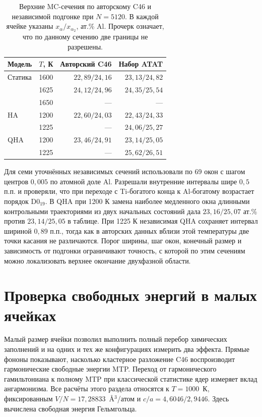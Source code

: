 \documentclass[11pt,a4paper]{article}
\begin{document}
\begin{table}[htbp]
\centering\small
\caption{Верхние MC-сечения по авторскому C46 и независимой подгонке
при \(N=5120\). В каждой ячейке указаны \(x_\alpha/x_{\alpha_2}\),
ат.\% Al. Прочерк означает, что по данному сечению две границы не разрешены.}
\label{tab:ce-upper}
\begin{tabular}{@{}lrrr@{}}
\toprule
Модель & \(T\), К & Авторский C46 & Набор ATAT\\
\midrule
Статика & 1600 & \(22{,}89/24{,}16\) & \(23{,}13/24{,}82\)\\
        & 1625 & \(24{,}12/24{,}96\) & \(24{,}35/25{,}54\)\\
        & 1650 & --- & ---\\
HA      & 1200 & \(22{,}60/24{,}03\) & \(22{,}43/24{,}33\)\\
        & 1225 & --- & \(24{,}06/25{,}27\)\\
QHA     & 1200 & \(23{,}46/24{,}91\) & \(23{,}14/25{,}05\)\\
        & 1225 & --- & \(25{,}62/26{,}51\)\\
\bottomrule
\end{tabular}
\end{table}

Для семи уточнённых независимых сечений использовали по 69 окон с
шагом центров \(0{,}005\) по атомной доле Al. Разрешали внутренние
интервалы шире \(0{,}5\) п.п. и проверяли, что при переходе с
Ti-богатого конца к Al-богатому возрастает порядок D0$_{19}$.
В QHA при 1200 К замена наиболее медленного окна длинными
контрольными траекториями из двух начальных состояний дала
\(23{,}16/25{,}07\) ат.\% против \(23{,}14/25{,}05\) в таблице.
При 1225 К независимая QHA сохраняет интервал шириной \(0{,}89\) п.п.,
тогда как в авторских данных вблизи этой температуры две точки касания
не различаются. Порог ширины, шаг окон, конечный размер и зависимость
от подгонки ограничивают точность, с которой по этим сечениям можно
локализовать верхнее окончание двухфазной области.

\section{Проверка свободных энергий в малых ячейках}
\label{sec:smallcells}

Малый размер ячейки позволил выполнить полный перебор химических заполнений и
на одних и тех же конфигурациях измерить два эффекта. Прямые фононы показывают,
насколько кластерное разложение C46 воспроизводит гармонические свободные
энергии MTP. Переход от гармонического гамильтониана к полному MTP при
классической статистике ядер измеряет вклад ангармонизма. Все расчёты этого
раздела относятся к $T=1000$~К, фиксированным $V/N=17{,}28833$~\AA$^3$/атом
и $c/a=4{,}6046/2{,}9446$. Здесь вычислена свободная энергия Гельмгольца.
\end{document}
